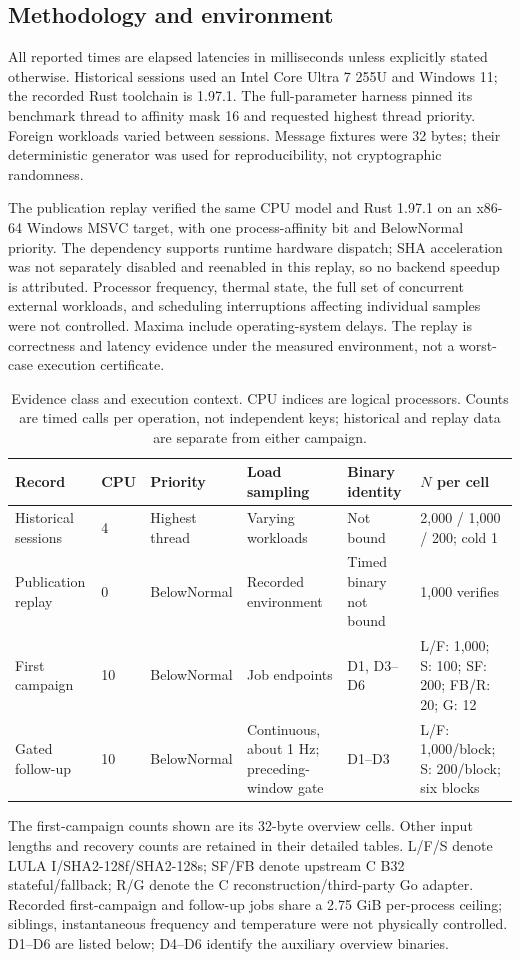 \documentclass[a4paper,envcountsame,runningheads]{llncs}
\begin{document}
\subsection{Methodology and environment}
All reported times are elapsed latencies in milliseconds unless explicitly stated otherwise. Historical sessions used an Intel Core Ultra 7 255U and Windows 11; the recorded Rust toolchain is 1.97.1. The full-parameter harness pinned its benchmark thread to affinity mask 16 and requested highest thread priority. Foreign workloads varied between sessions. Message fixtures were 32 bytes; their deterministic generator was used for reproducibility, not cryptographic randomness.

The publication replay verified the same CPU model and Rust 1.97.1 on an x86-64 Windows MSVC target, with one process-affinity bit and BelowNormal priority. The dependency supports runtime hardware dispatch; SHA acceleration was not separately disabled and reenabled in this replay, so no backend speedup is attributed. Processor frequency, thermal state, the full set of concurrent external workloads, and scheduling interruptions affecting individual samples were not controlled. Maxima include operating-system delays. The replay is correctness and latency evidence under the measured environment, not a worst-case execution certificate.

\begin{table}[!htbp]
\caption{Evidence class and execution context. CPU indices are logical processors. Counts are timed calls per operation, not independent keys; historical and replay data are separate from either campaign.}\label{tab:execution-contexts}
\centering\scriptsize\setlength{\tabcolsep}{2pt}
\begin{tabular}{P{18mm}P{8mm}P{19mm}P{20mm}P{23mm}P{21mm}}\toprule
Record & CPU & Priority & Load sampling & Binary identity & $N$ per cell\\\midrule
Historical sessions & 4 & Highest thread & Varying workloads & Not bound & 2,000 / 1,000 / 200; cold 1\\
Publication replay & 0 & BelowNormal & Recorded environment & Timed binary not bound & 1,000 verifies\\
First campaign & 10 & BelowNormal & Job endpoints & D1, D3--D6 & L/F: 1,000; S: 100; SF: 200; FB/R: 20; G: 12\\
Gated follow-up & 10 & BelowNormal & Continuous, about 1 Hz; preceding-window gate & D1--D3 & L/F: 1,000/block; S: 200/block; six blocks\\
\bottomrule\end{tabular}
\smallskip\par\raggedright\footnotesize The first-campaign counts shown are its 32-byte overview cells. Other input lengths and recovery counts are retained in their detailed tables. L/F/S denote LULA I/SHA2-128f/SHA2-128s; SF/FB denote upstream C B32 stateful/fallback; R/G denote the C reconstruction/third-party Go adapter. Recorded first-campaign and follow-up jobs share a 2.75 GiB per-process ceiling; siblings, instantaneous frequency and temperature were not physically controlled. D1--D6 are listed below; D4--D6 identify the auxiliary overview binaries.
\end{table}
\end{document}
